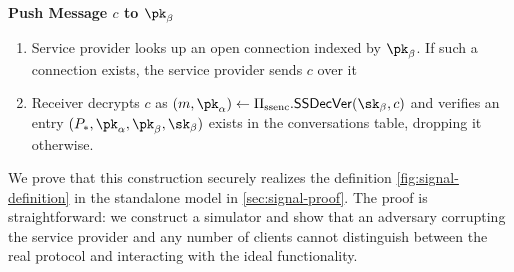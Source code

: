 \medskip \noindent
\textbf{Push Message $c$ to $\pk_\beta$}
\begin{enumerate}[noitemsep]
  \item Service provider looks up an open connection indexed by $\pk_\beta$.  If such a connection exists, the service provider sends $c$ over it
  \item Receiver decrypts $c$ as $(m,\pk_\alpha) \leftarrow \sealedsenderencryptionscheme.\sealedsenderencryptionvdec(\sk_\beta, c)$ and verifies
    an entry $(\personx, \pk_\alpha,\allowbreak \pk_\beta, \sk_\beta)$ exists in the conversations table,
    dropping it otherwise.
\end{enumerate}


We prove that this construction securely realizes the definition \cref{fig:signal-definition} in the standalone model in \cref{sec:signal-proof}.  The proof is straightforward: we construct a simulator and show that an adversary corrupting the service provider and any number of clients cannot distinguish between the real protocol and interacting with the ideal functionality.



